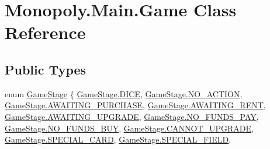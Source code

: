 \hypertarget{class_monopoly_1_1_main_1_1_game}{}\section{Monopoly.\+Main.\+Game Class Reference}
\label{class_monopoly_1_1_main_1_1_game}
\subsection*{Public Types}
\begin{DoxyCompactItemize}
\item 
enum \mbox{\hyperlink{class_monopoly_1_1_main_1_1_game_a52e7aaac8429c63b99ced40e268d03e2}{Game\+Stage}} \{ \newline
\mbox{\hyperlink{class_monopoly_1_1_main_1_1_game_a52e7aaac8429c63b99ced40e268d03e2a7136d42c1991b4901fb2ebb10c45ed87}{Game\+Stage.\+D\+I\+CE}}, 
\mbox{\hyperlink{class_monopoly_1_1_main_1_1_game_a52e7aaac8429c63b99ced40e268d03e2a24ce802dad4f363a652f77ce888c9b91}{Game\+Stage.\+N\+O\+\_\+\+A\+C\+T\+I\+ON}}, 
\mbox{\hyperlink{class_monopoly_1_1_main_1_1_game_a52e7aaac8429c63b99ced40e268d03e2a0cd4847c7180560d8dd0fdd13363d7d0}{Game\+Stage.\+A\+W\+A\+I\+T\+I\+N\+G\+\_\+\+P\+U\+R\+C\+H\+A\+SE}}, 
\mbox{\hyperlink{class_monopoly_1_1_main_1_1_game_a52e7aaac8429c63b99ced40e268d03e2a61ff8c8ed33dc3b8107ac9b647b8267a}{Game\+Stage.\+A\+W\+A\+I\+T\+I\+N\+G\+\_\+\+R\+E\+NT}}, 
\newline
\mbox{\hyperlink{class_monopoly_1_1_main_1_1_game_a52e7aaac8429c63b99ced40e268d03e2a2b64e20ec0d2bb60bd333ebe86b2a0f1}{Game\+Stage.\+A\+W\+A\+I\+T\+I\+N\+G\+\_\+\+U\+P\+G\+R\+A\+DE}}, 
\mbox{\hyperlink{class_monopoly_1_1_main_1_1_game_a52e7aaac8429c63b99ced40e268d03e2a9dce65ba0fbad023b3ece9f35a260d45}{Game\+Stage.\+N\+O\+\_\+\+F\+U\+N\+D\+S\+\_\+\+P\+AY}}, 
\mbox{\hyperlink{class_monopoly_1_1_main_1_1_game_a52e7aaac8429c63b99ced40e268d03e2a6b6c00857d2582d4ed270440cfa226e7}{Game\+Stage.\+N\+O\+\_\+\+F\+U\+N\+D\+S\+\_\+\+B\+UY}}, 
\mbox{\hyperlink{class_monopoly_1_1_main_1_1_game_a52e7aaac8429c63b99ced40e268d03e2a4a94ee5fbd2c304c2cfdb5f0f9138fcf}{Game\+Stage.\+C\+A\+N\+N\+O\+T\+\_\+\+U\+P\+G\+R\+A\+DE}}, 
\newline
\mbox{\hyperlink{class_monopoly_1_1_main_1_1_game_a52e7aaac8429c63b99ced40e268d03e2a294bf8c2e69c5ca1f527c102b6581bcf}{Game\+Stage.\+S\+P\+E\+C\+I\+A\+L\+\_\+\+C\+A\+RD}}, 
\mbox{\hyperlink{class_monopoly_1_1_main_1_1_game_a52e7aaac8429c63b99ced40e268d03e2a9a230a87112e44529cc4427968313119}{Game\+Stage.\+S\+P\+E\+C\+I\+A\+L\+\_\+\+F\+I\+E\+LD}}, 

\end{DoxyCompactItemize}
